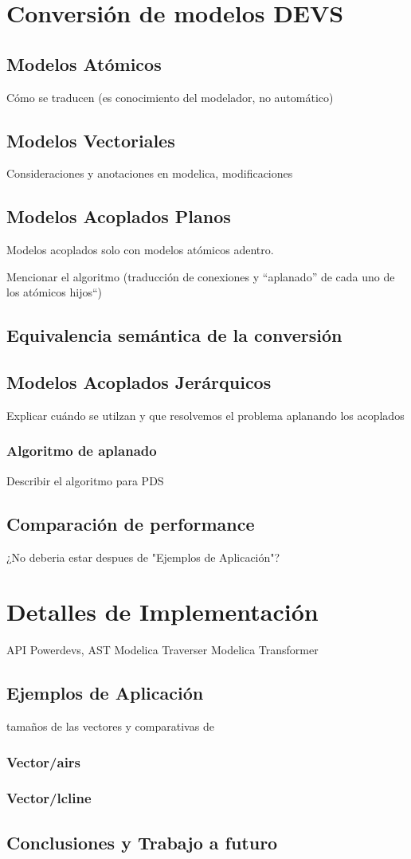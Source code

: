 \documentclass[a4paper,	11pt]{report}
\begin{document}
\chapter{Conversión de modelos DEVS}
\section{Modelos Atómicos}
Cómo se traducen (es conocimiento del modelador, no automático)
\section{Modelos Vectoriales}
Consideraciones  y anotaciones en modelica, modificaciones

\section{Modelos Acoplados Planos}
Modelos acoplados solo con modelos atómicos adentro.	

Mencionar el algoritmo (traducción de conexiones y ``aplanado'' de cada uno de los atómicos hijos``)	

\section{Equivalencia semántica de la conversión}

\section{Modelos Acoplados Jerárquicos}
Explicar cuándo se utilzan y que resolvemos el problema aplanando los acoplados

\subsection{Algoritmo de aplanado}
Describir el algoritmo para PDS

\section{Comparación de performance}
¿No deberia estar despues de "Ejemplos de Aplicación"?

\chapter{Detalles de Implementación}
API Powerdevs, AST Modelica
Traverser
Modelica Transformer


\section{Ejemplos de Aplicación}
tamaños de las vectores y comparativas de 
\subsection{Vector/airs}
\subsection{Vector/lcline}
\nocite{*}
\section{Conclusiones y Trabajo a futuro}




\end{document}
